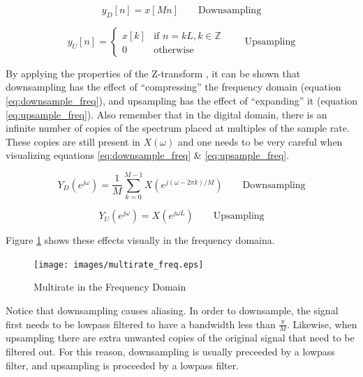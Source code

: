 \documentclass[a4paper, 12pt]{article}
\begin{document}
\begin{equation}
\label{eq:downsampling}
y_D[n] = x[Mn] \qquad \text{Downsampling}
\end{equation}

\begin{equation}
\label{eq:upsampling}
y_U[n] = 
  \begin{cases}
    x[k] & \text{if } n = kL, k \in \mathbb{Z} \\
    0 & \text{otherwise}
  \end{cases}
  \qquad \text{Upsampling}
\end{equation}

By applying the properties of the Z-transform \cite{multirate2}, it can be shown that downsampling has the effect of ``compressing'' the frequency domain (equation \ref{eq:downsample_freq}), and upsampling has the effect of ``expanding'' it (equation \ref{eq:upsample_freq}).  Also remember that in the digital domain, there is an infinite number of copies of the spectrum placed at multiples of the sample rate.  These copies are still present in $X(\omega)$ and one needs to be very careful when visualizing equations \ref{eq:downsample_freq} \& \ref{eq:upsample_freq}.

\begin{equation}
\label{eq:downsample_freq}
Y_D(e^{j\omega}) = \frac{1}{M}\sum_{k=0}^{M-1}X(e^{j(\omega - 2\pi k)/M}) \qquad \text{Downsampling}
\end{equation}

\begin{equation}
\label{eq:upsample_freq}
Y_U(e^{j\omega}) = X(e^{j\omega L}) \qquad \text{Upsampling}
\end{equation}

Figure \ref{fig:multirate_freq} shows these effects visually in the frequency domaina.

\begin{figure}[h]
\caption{Multirate in the Frequency Domain}
\label{fig:multirate_freq}
\centering
\texttt{[image: images/multirate\_freq.eps]}
\end{figure}

Notice that downsampling causes aliasing.  In order to downsample, the signal first needs to be lowpass filtered to have a bandwidth less than $\frac{\pi}{M}$.  Likewise, when upsampling there are extra unwanted copies of the original signal that need to be filtered out.  For this reason, downsampling is usually preceeded by a lowpass filter, and upsampling is proceeded by a lowpass filter.
\end{document}
